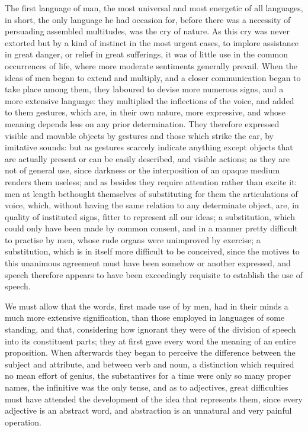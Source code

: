 \documentclass[11pt,twocolumn]{ltugboat}
\begin{document}
The first language of man, the most universal and most energetic of
all languages, in short, the only language he had occasion for, before
there was a necessity of persuading assembled multitudes, was the cry
of nature. As this cry was never extorted but by a kind of instinct in
the most urgent cases, to implore assistance in great danger, or
relief in great sufferings, it was of little use in the common
occurrences of life, where more moderate sentiments generally prevail.
When the ideas of men began to extend and multiply, and a closer
communication began to take place among them, they laboured to devise
more numerous signs, and a more extensive language: they multiplied
the inflections of the voice, and added to them gestures, which are,
in their own nature, more expressive, and whose meaning depends less
on any prior determination. They therefore expressed visible and
movable objects by gestures and those which strike the ear, by
imitative sounds: but as gestures scarcely indicate anything except
objects that are actually present or can be easily described, and
visible actions; as they are not of general use, since darkness or the
interposition of an opaque medium renders them useless; and as besides
they require attention rather than excite it: men at length bethought
themselves of substituting for them the articulations of voice, which,
without having the same relation to any determinate object, are, in
quality of instituted signs, fitter to represent all our ideas; a
substitution, which could only have been made by common consent, and
in a manner pretty difficult to practise by men, whose rude organs
were unimproved by exercise; a substitution, which is in itself more
difficult to be conceived, since the motives to this unanimous
agreement must have been somehow or another expressed, and speech
therefore appears to have been exceedingly requisite to establish the
use of speech.

We must allow that the words, first made use of by men, had in their
minds a much more extensive signification, than those employed in
languages of some standing, and that, considering how ignorant they
were of the division of speech into its constituent parts; they at
first gave every word the meaning of an entire proposition. When
afterwards they began to perceive the difference between the subject
and attribute, and between verb and noun, a distinction which required
no mean effort of genius, the substantives for a time were only so
many proper names, the infinitive was the only tense, and as to
adjectives, great difficulties must have attended the development of
the idea that represents them, since every adjective is an abstract
word, and abstraction is an unnatural and very painful operation.
\end{document}
